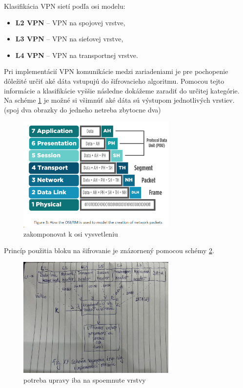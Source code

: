 Klasifikácia VPN sietí podľa \acrshort{osi} modelu:
\begin{itemize}
	\item{\textbf{L2 VPN}} -- VPN na spojovej vrstve,
	\item{\textbf{L3 VPN}} -- VPN na sieťovej vrstve,
	\item{\textbf{L4 VPN}} -- VPN na transportnej vrstve.
\end{itemize}

Pri implementácií VPN komunikácie medzi zariadeniami je pre pochopenie dôležité určiť aké dáta vstupujú do šifrovacieho algoritmu. Pomocou tejto informácie a klasifikácie vyššie následne dokážeme zaradiť do určitej kategórie. Na schéme \ref{osidata} je možné si všimnúť aké dáta sú výstupom jednotlivých vrstiev. (spoj dva obrazky do jedneho netreba zbytocne dva)

\begin{figure}[!h]
	\centering
	\includegraphics[width=0.7\textwidth]{figures/osidata}
	\caption{zakomponovat k osi vysvetleniu}
	\label{osidata}
\end{figure}

Princíp použitia bloku na šifrovanie je znázornený pomocou schémy \ref{sifr}.

\begin{figure}[!h]
	\centering
	\includegraphics[width=0.7\textwidth]{figures/sifr.jpg}
	\caption{potreba upravy iba na spoemnute vrstvy}
	\label{sifr}
\end{figure}

